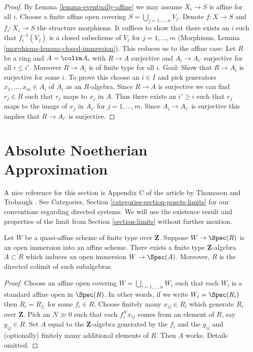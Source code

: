 \begin{proof}
By Lemma \ref{lemma-eventually-affine}
we may assume $X_i \to S$ is affine for all $i$.
Choose a finite affine open covering $S = \bigcup_{j = 1, \ldots, n} V_j$.
Denote $f : X \to S$ and $f_i : X_i \to S$ the structure morphisms.
It suffices to show that there exists an $i$ such that
$f_i^{-1}(V_j)$ is a closed subscheme of $V_j$ for $j = 1, \ldots, m$
(Morphisms, Lemma \ref{morphisms-lemma-closed-immersion}).
This reduces us to the affine case: Let $R$ be a ring and
$A = \colim A_i$ with $R \to A$ surjective and $A_i \to A_{i'}$
surjective for all $i \leq i'$. Moreover $R \to A_i$ is of finite type
for all $i$. Goal: Show that $R \to A_i$ is surjective for some $i$.
To prove this choose an $i \in I$ and pick generators
$x_1, \ldots, x_m \in A_i$ of $A_i$ as an $R$-algebra.
Since $R \to A$ is surjective we can find
$r_j \in R$ such that $r_j$ maps to $x_j$ in $A$.
Thus there exists an $i' \geq i$ such that $r_j$ maps to the image
of $x_j$ in $A_{i'}$ for $j = 1, \ldots, m$. Since $A_i \to A_{i'}$
is surjective this implies that $R \to A_{i'}$ is surjective.
\end{proof}










\section{Absolute Noetherian Approximation}
\label{section-approximation}

\noindent
A nice reference for this section is Appendix C of the article
by Thomason and Trobaugh \cite{TT}.
See Categories, Section \ref{categories-section-posets-limits}
for our conventions regarding directed systems.
We will use the existence result and properties of the limit
from Section \ref{section-limits} without further mention.

\begin{lemma}
\label{lemma-quasi-affine-finite-type-over-Z}
Let $W$ be a quasi-affine scheme of finite type over
$\mathbf{Z}$. Suppose $W \to \Spec(R)$ is an
open immersion into an affine scheme. There exists a
finite type $\mathbf{Z}$-algebra $A \subset R$
which induces an open immersion $W \to \Spec(A)$.
Moreover, $R$ is the directed colimit of such subalgebras.
\end{lemma}

\begin{proof}
Choose an affine open covering $W = \bigcup_{i = 1, \ldots, n} W_i$
such that each $W_i$ is a standard affine open in $\Spec(R)$.
In other words, if we write $W_i = \Spec(R_i)$
then $R_i = R_{f_i}$ for some $f_i \in R$.
Choose finitely many $x_{ij} \in R_i$ which generate
$R_i$ over $\mathbf{Z}$.
Pick an $N \gg 0$ such that each $f_i^Nx_{ij}$ comes from an
element of $R$, say $y_{ij} \in R$.
Set $A$ equal to the $\mathbf{Z}$-algebra generated by
the $f_i$ and the $y_{ij}$ and (optionally) finitely many
additional elements of $R$. Then $A$ works. Details omitted.
\end{proof}

